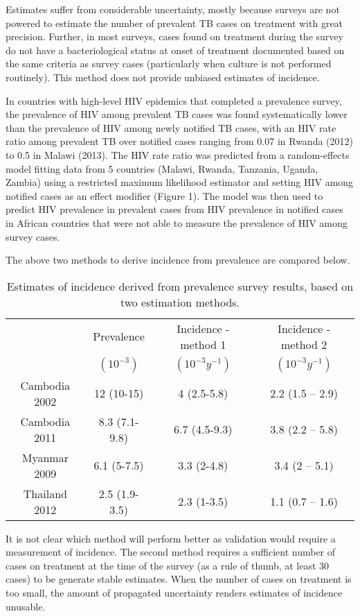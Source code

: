 Estimates suffer from considerable uncertainty, mostly because surveys are not powered to estimate the number of prevalent TB cases on treatment with great precision. Further, in most surveys, cases found on treatment during the survey do not have a bacteriological status at onset of treatment documented based on the same criteria as survey cases (particularly when culture is not performed routinely). This method does not provide unbiased estimates of incidence. 

In countries with high-level HIV epidemics that completed a prevalence survey, the prevalence of HIV among prevalent TB cases was found systematically lower than the prevalence of HIV among newly notified TB cases, with an HIV rate ratio among prevalent TB over notified cases ranging from 0.07 in Rwanda (2012) to 0.5 in Malawi (2013). The HIV rate ratio was predicted from a random-effects model fitting data from 5 countries (Malawi, Rwanda, Tanzania, Uganda, Zambia) using a restricted maximum likelihood estimator and setting HIV among notified cases as an effect modifier (Figure 1). The model was then used to predict HIV prevalence in prevalent cases from HIV prevalence in notified cases in African countries that were not able to measure the prevalence of HIV among survey cases.

The above two methods to derive incidence from prevalence are compared below.

\begin{table} 
    \begin{tabular}{ c c c c }
    \hline
         & Prevalence & Incidence - method 1 & Incidence - method 2 \\ 
         & $(10^{-3})$  & $(10^{-3} y^{-1})$     & $(10^{-3} y^{-1})$ \\
    \hline
        Cambodia 2002 & 12 (10-15) & 4 (2.5-5.8) & 2.2 (1.5 – 2.9) \\ 
        Cambodia 2011 & 8.3 (7.1-9.8) & 6.7 (4.5-9.3) & 3.8 (2.2 – 5.8) \\ 
        Myanmar 2009 & 6.1 (5-7.5) & 3.3 (2-4.8) & 3.4 (2 – 5.1) \\ 
        Thailand 2012 & 2.5 (1.9-3.5) & 2.3 (1-3.5) & 1.1 (0.7 – 1.6) \\ 
    \hline
    \end{tabular} 
    \caption{Estimates of incidence derived from prevalence survey results, based on two estimation methods.} 
\end{table}

It is not clear which method will perform better as validation would require a measurement of incidence. The second method requires a sufficient number of cases on treatment at the time of the survey (as a rule of thumb, at least 30 cases) to be generate stable estimates. When the number of cases on treatment is too small, the amount of propagated uncertainty renders estimates of incidence unusable. 

